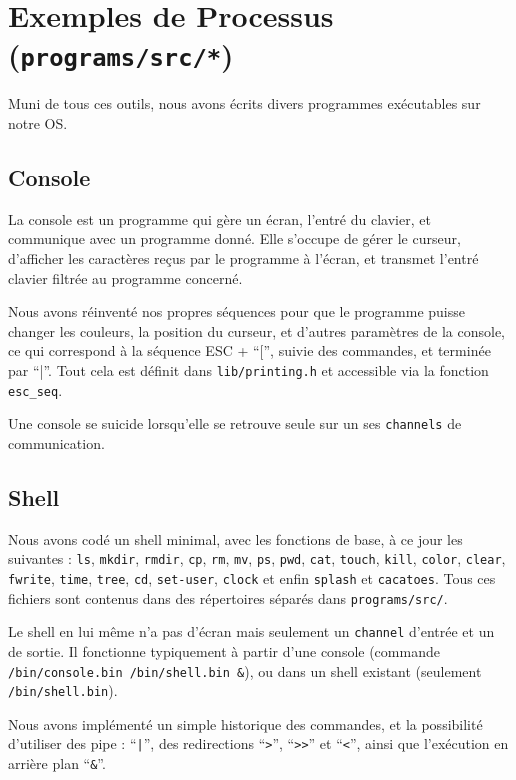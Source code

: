\documentclass[a4paper,10pt, french]{article}
\newcommand{\code}[1]{\texttt{#1}}
\newcommand{\chan}{\texttt{channel} }
\begin{document}
\section{Exemples de Processus (\code{programs/src/*})}

Muni de tous ces outils, nous avons écrits divers programmes exécutables sur notre OS.

\subsection{Console}
La console est un programme qui gère un écran, l'entré du clavier, et communique avec un programme donné.
Elle s'occupe de gérer le curseur, d'afficher les caractères reçus par le programme à l'écran, et transmet 
l'entré clavier filtrée au programme concerné.

Nous avons réinventé nos propres séquences pour que le programme puisse changer les couleurs, la position du curseur,
et d'autres paramètres de la console, ce qui correspond à la séquence ESC + ``['', suivie des commandes, et terminée par ``|''.
Tout cela est définit dans \code{lib/printing.h} et accessible via la fonction \code{esc\_seq}.

Une console se suicide lorsqu'elle se retrouve seule sur un ses \code{channels} de communication.

\subsection{Shell}
Nous avons codé un shell minimal, avec les fonctions de base, à ce jour les suivantes : \code{ls},
\code{mkdir}, \code{rmdir}, \code{cp}, \code{rm}, \code{mv}, \code{ps}, \code{pwd}, \code{cat},
\code{touch}, \code{kill}, \code{color}, \code{clear}, \code{fwrite}, 
\code{time}, \code{tree}, \code{cd}, \code{set-user}, \code{clock} et enfin \code{splash} et \code{cacatoes}.
Tous ces fichiers sont contenus dans des répertoires séparés dans \code{programs/src/}.

Le shell en lui même n'a pas d'écran mais seulement un \chan d'entrée et un de sortie. Il fonctionne
typiquement à partir d'une console (commande \code{/bin/console.bin /bin/shell.bin \&}), ou dans un shell
existant (seulement \code{/bin/shell.bin}).

Nous avons implémenté un simple historique des commandes, et la possibilité d'utiliser des pipe : ``\code{|}'',
des redirections ``\code{>}'', ``\code{>>}'' et ``\code{<}'', ainsi que l'exécution en arrière 
plan ``\code{\&}''.
\end{document}
